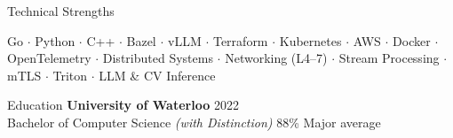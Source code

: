 \documentclass{resume} %
\begin{document}

\begin{rSection}{Technical Strengths}

    Go $\cdot$ Python $\cdot$ C++ $\cdot$ Bazel $\cdot$ vLLM $\cdot$ Terraform $\cdot$ Kubernetes $\cdot$ AWS $\cdot$ Docker $\cdot$ OpenTelemetry $\cdot$ Distributed Systems $\cdot$ Networking (L4--7) $\cdot$ Stream Processing $\cdot$ mTLS $\cdot$ Triton $\cdot$ LLM \& CV Inference

\end{rSection}


\begin{rSection}{Education}
    {\bf University of Waterloo} \hfill 2022 \\
    Bachelor of Computer Science {\em (with Distinction)} \hfill { 88\% Major average}
\end{rSection}

\end{document}
